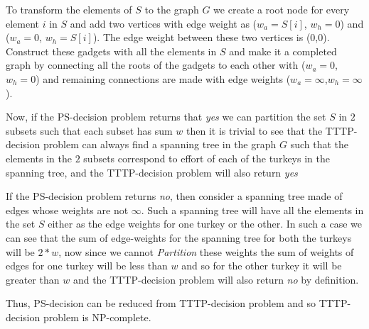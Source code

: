 \documentclass[8pt]{article}
\begin{document}
To transform the elements of $S$ to the graph $G$ we create a root node for every element $i$ in $S$ and add two vertices with edge weight as ($w_a = S[i]$, $w_h = 0$) and ($w_a = 0$, $w_h = S[i]$). The edge weight between these two vertices is (0,0). Construct these gadgets with all the elements in $S$ and make it a completed graph by connecting all the roots of the gadgets to each other with ($w_a = 0$,$w_h = 0$) and remaining connections are made with edge weights ($w_a = \infty$,$w_h = \infty$).

Now, if the PS-decision problem returns that \textit{yes} we can partition the set $S$ in $2$ subsets such that each subset has sum $w$ then it is trivial to see that the TTTP-decision problem can always find a spanning tree in the graph $G$ such that the elements in the $2$ subsets correspond to effort of each of the turkeys in the spanning tree, and the TTTP-decision problem will also return \textit{yes}

If the PS-decision problem returns \textit{no}, then consider a spanning tree made of edges whose weights are not $\infty$. Such a spanning tree will have all the elements in the set $S$ either as the edge weights for one turkey or the other. In such a case we can see that the sum of edge-weights for the spanning tree for both the turkeys will be $2*w$, now since we cannot \textit{Partition} these weights the sum of weights of edges for one turkey will be less than $w$ and so for the other turkey it will be greater than $w$ and the TTTP-decision problem will also return \textit{no} by definition.

Thus, PS-decision can be reduced from TTTP-decision problem and so TTTP-decision problem is NP-complete.
\end{document}
